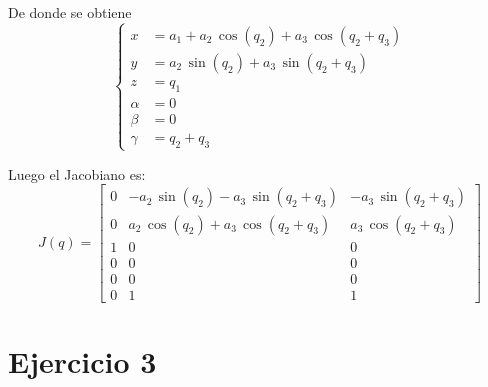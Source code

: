 \documentclass[a4paper,12pt]{article}
\begin{document}
De donde se obtiene
\begin{equation*}
    \left\{
        \begin{aligned}
            x &= a_1 +  a_2\,\cos(q_2) + a_3\,\cos(q_2 + q_3)\\
            y &= a_2\,\sin(q_2) + a_3\,\sin(q_2 + q_3)\\
            z &= q_1\\
            \alpha &= 0\\
            \beta  &= 0\\
            \gamma &= q_2 + q_3
        \end{aligned}
    \right.
\end{equation*}

Luego el Jacobiano es:
\begin{equation}
    J(q) = 
    \begin{bmatrix}
        0 & -a_2\,\sin(q_2) - a_3\,\sin(q_2 + q_3) & -a_3\,\sin(q_2 + q_3)\\
        0 & a_2\,\cos(q_2) + a_3\,\cos(q_2 + q_3)  & a_3\,\cos(q_2 + q_3)\\
        1 & 0 & 0 \\
        0 & 0 & 0 \\
        0 & 0 & 0 \\
        0 & 1 & 1
    \end{bmatrix}
\end{equation}

\section{Ejercicio 3}

\end{document}
